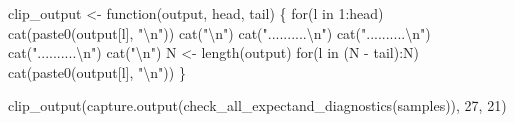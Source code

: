 \documentclass[
  letterpaper,
  DIV=11,
  numbers=noendperiod]{scrartcl}
\newenvironment{Shaded}{\begin{snugshade}}{\end{snugshade}}
\newcommand{\ControlFlowTok}[1]{\textcolor[rgb]{0.00,0.23,0.31}{#1}}
\newcommand{\DecValTok}[1]{\textcolor[rgb]{0.68,0.00,0.00}{#1}}
\newcommand{\FunctionTok}[1]{\textcolor[rgb]{0.28,0.35,0.67}{#1}}
\newcommand{\NormalTok}[1]{\textcolor[rgb]{0.00,0.23,0.31}{#1}}
\newcommand{\OtherTok}[1]{\textcolor[rgb]{0.00,0.23,0.31}{#1}}
\newcommand{\SpecialCharTok}[1]{\textcolor[rgb]{0.37,0.37,0.37}{#1}}
\newcommand{\StringTok}[1]{\textcolor[rgb]{0.13,0.47,0.30}{#1}}
\begin{document}
\begin{Shaded}
\begin{Highlighting}[]
\NormalTok{clip\_output }\OtherTok{\textless{}{-}} \ControlFlowTok{function}\NormalTok{(output, head, tail) \{}
  \ControlFlowTok{for}\NormalTok{(l }\ControlFlowTok{in} \DecValTok{1}\SpecialCharTok{:}\NormalTok{head)}
    \FunctionTok{cat}\NormalTok{(}\FunctionTok{paste0}\NormalTok{(output[l], }\StringTok{"}\SpecialCharTok{\textbackslash{}n}\StringTok{"}\NormalTok{))}
  \FunctionTok{cat}\NormalTok{(}\StringTok{"}\SpecialCharTok{\textbackslash{}n}\StringTok{"}\NormalTok{)}
  \FunctionTok{cat}\NormalTok{(}\StringTok{"..........}\SpecialCharTok{\textbackslash{}n}\StringTok{"}\NormalTok{)}
  \FunctionTok{cat}\NormalTok{(}\StringTok{"..........}\SpecialCharTok{\textbackslash{}n}\StringTok{"}\NormalTok{)}
  \FunctionTok{cat}\NormalTok{(}\StringTok{"..........}\SpecialCharTok{\textbackslash{}n}\StringTok{"}\NormalTok{)}
  \FunctionTok{cat}\NormalTok{(}\StringTok{"}\SpecialCharTok{\textbackslash{}n}\StringTok{"}\NormalTok{)}
\NormalTok{  N }\OtherTok{\textless{}{-}} \FunctionTok{length}\NormalTok{(output)}
  \ControlFlowTok{for}\NormalTok{(l }\ControlFlowTok{in}\NormalTok{ (N }\SpecialCharTok{{-}}\NormalTok{ tail)}\SpecialCharTok{:}\NormalTok{N)}
    \FunctionTok{cat}\NormalTok{(}\FunctionTok{paste0}\NormalTok{(output[l], }\StringTok{"}\SpecialCharTok{\textbackslash{}n}\StringTok{"}\NormalTok{))}
\NormalTok{\}}
\end{Highlighting}
\end{Shaded}

\begin{Shaded}
\begin{Highlighting}[]
\FunctionTok{clip\_output}\NormalTok{(}\FunctionTok{capture.output}\NormalTok{(}\FunctionTok{check\_all\_expectand\_diagnostics}\NormalTok{(samples)), }
            \DecValTok{27}\NormalTok{, }\DecValTok{21}\NormalTok{)}
\end{Highlighting}
\end{Shaded}
\end{document}
